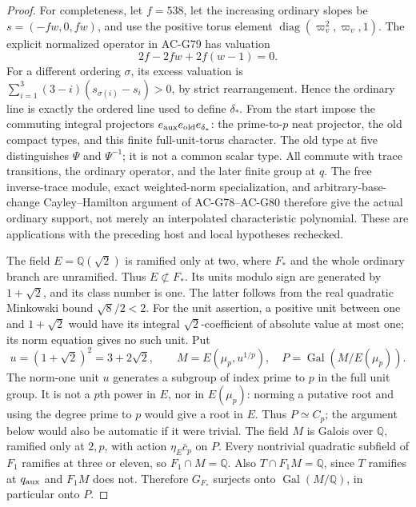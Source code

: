 \begin{proof}
For completeness, let \(f=538\), let the increasing ordinary
slopes be \(s=(-fw,0,fw)\), and use the positive torus element
\(\operatorname{diag}(\varpi_v^2,\varpi_v,1)\).
The explicit normalized operator in AC-G79 has valuation
\[
                  2f-2fw+2f(w-1)=0 .
\]
For a different ordering \(\sigma\), its excess valuation is
\(\sum_{i=1}^3(3-i)(s_{\sigma(i)}-s_i)>0\), by strict
rearrangement.  Hence the ordinary line is exactly the ordered
line used to define \(\delta_*\).
From the start impose the commuting integral projectors
\(e_{\rm aux}e_{\rm old}e_{\delta_*}\): the prime-to-\(p\)
neat projector, the old compact types, and this finite
full-unit-torus character.
The old type at five distinguishes \(\Psi\) and \(\Psi^{-1}\);
it is not a common scalar type.
All commute with trace transitions, the ordinary operator,
and the later finite group at \(q\).
The free inverse-trace module, exact weighted-norm specialization,
and arbitrary-base-change Cayley--Hamilton argument of
AC-G78--AC-G80 therefore give the actual ordinary support,
not merely an interpolated characteristic polynomial.
These are applications with the preceding host and local
hypotheses rechecked.

The field \(E=\mathbb Q(\sqrt2)\) is ramified only at two,
where \(F_*\) and the whole ordinary branch are unramified.
Thus \(E\not\subset F_*\).
Its units modulo sign are generated by \(1+\sqrt2\), and
its class number is one.  The latter follows from the real
quadratic Minkowski bound \(\sqrt8/2<2\).
For the unit assertion, a positive unit between one and
\(1+\sqrt2\) would have its integral \(\sqrt2\)-coefficient
of absolute value at most one; its norm equation gives no
such unit.  Put
\[
 u=(1+\sqrt2)^2=3+2\sqrt2,
 \qquad M=E(\mu_p,u^{1/p}),\quad
 P=\operatorname{Gal}(M/E(\mu_p)).
 \tag{G136.14}
\]
The norm-one unit \(u\) generates a subgroup of index prime
to \(p\) in the full unit group.
It is not a \(p\)th power in \(E\), nor in \(E(\mu_p)\):
norming a putative root and using the degree prime to \(p\)
would give a root in \(E\).
Thus \(P\simeq C_p\); the argument below would also be
automatic if it were trivial.
The field \(M\) is Galois over \(\mathbb Q\), ramified only
at \(2,p\), with action \(\eta_E\bar c_p\) on \(P\).
Every nontrivial quadratic subfield of \(F_1\) ramifies at
three or eleven, so \(F_1\cap M=\mathbb Q\).
Also \(T\cap F_1M=\mathbb Q\), since \(T\) ramifies at
\(q_{\rm aux}\) and \(F_1M\) does not.  Therefore \(G_{F_*}\)
surjects onto \(\operatorname{Gal}(M/\mathbb Q)\), in particular
onto \(P\).


\end{proof}
